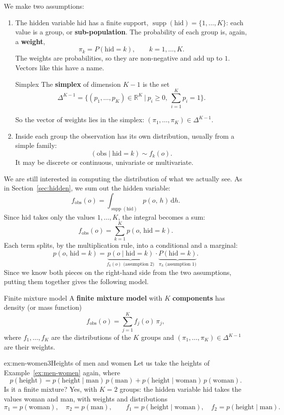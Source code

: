 \documentclass[a4paper,12pt,oneside]{report}
\begin{document}
We make two assumptions:
\begin{enumerate}
\item The hidden variable $\text{hid}$ has a finite support,
$\operatorname{supp}(\text{hid})=\{1,\ldots,K\}$: each value is a group, or
\textbf{sub-population}. The probability of each group is, again, a
\textbf{weight},
\[
\pi_k=P(\text{hid}=k),\qquad k=1,\ldots,K.
\]
The weights are probabilities, so they are non-negative and add up to $1$.
Vectors like this have a name.

\begin{frameddefn}{Simplex}\label{def:simplex}
The \textbf{simplex} of dimension $K-1$ is the set
\[
\Delta^{K-1}=\Big\{(p_1,\ldots,p_K)\in\mathbb{R}^K\ \Big|\ p_i\ge0,\
\sum_{i=1}^K p_i=1\Big\}.
\]
\end{frameddefn}

So the vector of weights lies in the simplex:
$(\pi_1,\ldots,\pi_K)\in\Delta^{K-1}$.
\item Inside each group the observation has its own distribution, usually
from a simple family:
\[
(\text{obs}\mid \text{hid}=k)\sim f_k(o).
\]
It may be discrete or continuous, univariate or multivariate.
\end{enumerate}

We are still interested in computing the distribution of what we actually
see. As in Section~\ref{sec:hidden}, we sum out the hidden variable:
\[
f_{\text{obs}}(o)=\int_{\operatorname{supp}(\text{hid})}p(o,\,h)\,\mathrm{d}h .
\]
Since $\text{hid}$ takes only the values $1,\ldots,K$, the integral becomes a sum:
\[
f_{\text{obs}}(o)=\sum_{k=1}^K p(o,\,\text{hid}=k).
\]
Each term splits, by the multiplication rule, into a conditional and a
marginal:
\[
p(o,\,\text{hid}=k)=\underbrace{p(o\mid \text{hid}=k)}_{f_k(o)\text{ (assumption 2)}}\cdot
\underbrace{P(\text{hid}=k)}_{\pi_k\text{ (assumption 1)}}.
\]
Since we know both pieces on the right-hand side from the two assumptions, putting them together
gives the following model.

\begin{frameddefn}{Finite mixture model}\label{def:finite-mixture}
A \textbf{finite mixture model} with $K$ \textbf{components} has density (or
mass function)
\[
f_{\text{obs}}(o)=\sum_{j=1}^K f_j(o)\,\pi_j,
\]
where $f_1,\ldots,f_K$ are the distributions of the $K$ groups and
$(\pi_1,\ldots,\pi_K)\in\Delta^{K-1}$ are their weights.
\end{frameddefn}

\begin{framedexamplepart}{ex:men-women}{3}{Heights of men and women}\label{ex:men-women-3}
Let us take the heights of Example~\ref{ex:men-women} again, where
\[
p(\text{height})=p(\text{height}\mid\text{man})\,p(\text{man})
+p(\text{height}\mid\text{woman})\,p(\text{woman}).
\]
Is it a finite mixture? Yes, with $K=2$ groups: the hidden variable $\text{hid}$
takes the values woman and man, with weights and distributions
\[
\pi_1=p(\text{woman}),\quad \pi_2=p(\text{man}),\qquad
f_1=p(\text{height}\mid\text{woman}),\quad f_2=p(\text{height}\mid\text{man}).
\]
\end{framedexamplepart}
\end{document}

